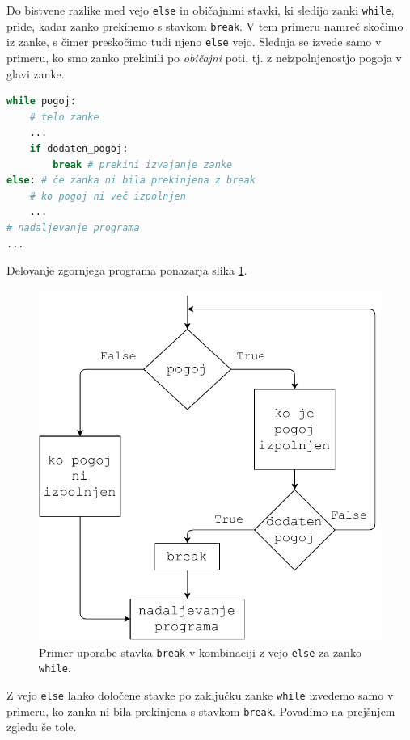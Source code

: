 Do bistvene razlike med vejo \texttt{else} in običajnimi stavki, ki sledijo zanki \texttt{while}, pride, kadar zanko prekinemo s stavkom \texttt{break}. V tem primeru namreč skočimo iz zanke, s čimer preskočimo tudi njeno \texttt{else} vejo. Slednja se izvede samo v primeru, ko smo zanko prekinili po \emph{običajni} poti, tj. z neizpolnjenostjo pogoja v glavi zanke.  
\begin{lstlisting}[language=Python]
while pogoj:
    # telo zanke
    ...
    if dodaten_pogoj:
        break # prekini izvajanje zanke
else: # če zanka ni bila prekinjena z break
    # ko pogoj ni več izpolnjen
    ...
# nadaljevanje programa
...
\end{lstlisting}
Delovanje zgornjega programa ponazarja slika \ref{img:while3}.
\begin{figure}
    \centering
    \includegraphics[width=0.5\linewidth]{img/while3.pdf}
    \caption{Primer uporabe stavka \texttt{break} v kombinaciji z vejo \texttt{else} za zanko \texttt{while}.}
    \label{img:while3}
\end{figure}

Z vejo \texttt{else} lahko določene stavke po zaključku zanke \texttt{while} izvedemo samo v primeru, ko zanka ni bila prekinjena s stavkom \texttt{break}. Povadimo na prejšnjem zgledu še tole.

